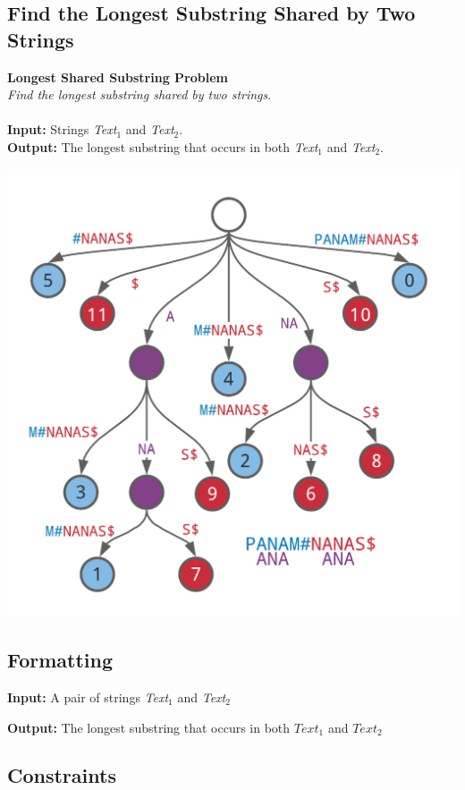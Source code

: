 \documentclass{article}
\begin{document}
\subsection{Find the Longest Substring Shared by Two Strings}
\hline\vspace{5}
\textbf{Longest Shared Substring Problem}\\
\emph{Find the longest substring shared by two strings}.\\ \\
\textbf{Input:} Strings \emph{Text}$_1$ and \emph{Text}$_2$.\\
\textbf{Output:} The longest substring that occurs in both \emph{Text}$_1$ and \emph{Text}$_2$.
\begin{center}
    \includegraphics[scale=0.2]{c9/logos/9E.png} 
\end{center}
\hline \vspace{5}
\subsection*{Formatting}

\textbf{Input:} A pair of strings \emph{Text}$_1$ and \emph{Text}$_2$

\noindent\textbf{Output:} The longest substring that occurs in both $Text_1$ and $Text_2$

\subsection*{Constraints}
\end{document}
